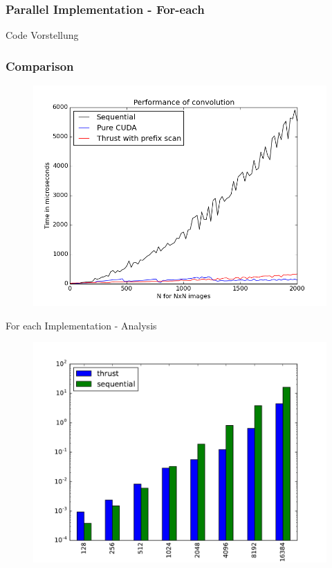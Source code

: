 \documentclass{beamer}
\begin{document}
\begin{frame}
\frametitle{Parallel Implementation - For-each}

Code Vorstellung
\end{frame}

\begin{frame}
\frametitle{Comparison}
\begin{figure}
\centering
    \includegraphics[scale=0.4]{imgs/performance.png}
    
    \end{figure}
\end{frame}

\begin{frame}{For each Implementation - Analysis}
  \begin{figure}
    \includegraphics[scale=0.4]{imgs/thrust_vs_sequential_total.pdf} 
  \end{figure}
\end{frame} 
\end{document}
